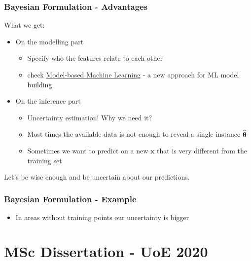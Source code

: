 \documentclass{beamer}
\newcommand{\thetab}{\boldsymbol{\theta}}
\newcommand{\xb}{\boldsymbol{x}}
\begin{document}
\begin{frame}
  \frametitle{Bayesian Formulation - Advantages}
  What we get:
  \begin{itemize}
  \item On the modelling part
    \begin{itemize}
    \item Specify who the features relate to each other
    \item check \href{https://www.mbmlbook.com/}{Model-based Machine Learning} - a new approach for ML model building
    \end{itemize}
  \item On the inference part
    \begin{itemize}
    \item Uncertainty estimation! Why we need it?
    \item Most times the available data is not enough to reveal a single instance $\hat{\thetab}$
    \item Sometimes we want to predict on a new $\xb$ that is very
      different from the training set
    \end{itemize}
  \end{itemize}
\noindent\makebox[\linewidth]{\rule{\paperwidth}{0.4pt}}
\alert{Let's be wise enough and be uncertain about our predictions.}
\end{frame}


\begin{frame}

  \frametitle{Bayesian Formulation - Example}  \begin{itemize}
    \item In areas without training points our uncertainty is bigger
  \end{itemize}


  \begin{figure}[ht]
    \centering
    \label{fig:bayesian_predictive}
  \end{figure}
\end{frame}

\section{MSc Dissertation - UoE 2020}


% 
\end{document}
